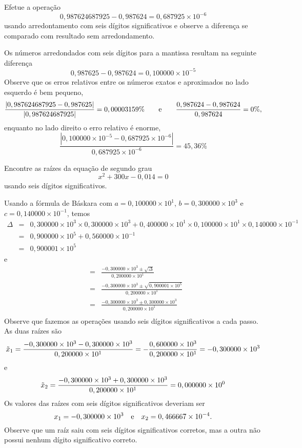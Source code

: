 \begin{ex}Efetue a operação
$$
0,987624687925-0,987624=0,687925\times 10^{-6}
$$
usando arredontamento com seis dígitos significativos e observe a diferença se comparado com resultado sem arredondamento.

Os números arredondados com seis dígitos para a mantissa resultam na seguinte diferença
$$
0,987625-0,987624=0,100000\times 10^{-5}
$$
Observe que os erros relativos entre os números exatos e aproximados no lado esquerdo é bem pequeno,
$$
\frac{|0,987624687925-0,987625|}{|0,987624687925|}=0,00003159\%\qquad\hbox{e}\qquad \frac{0,987624-0,987624}{0,987624}=0\%,
$$
enquanto no lado direito o erro relativo é enorme,
$$
\frac{|0,100000\times 10^{-5}-0,687925\times 10^{-6}|}{0,687925\times 10^{-6}}=45,36\%
$$

\end{ex}

\begin{ex} Encontre as raízes da equação de segundo grau
$$
x^2+300x-0,014=0
$$
usando seis dígitos significativos.

Usando a fórmula de Báskara com $a=0,100000\times 10^1$, $b=0,300000\times 10^3$ e $c=0,140000\times 10^{-1}$, temos
\begin{eqnarray*}
\Delta&=&0,300000\times 10^3\times 0,300000\times 10^3 +0,400000\times 10^1\times 0,100000\times 10^1\times 0,140000\times 10^{-1}\\
&=&0,900000\times 10^5 +0,560000\times  10^{-1}\\
&=&0,900001\times 10^5
\end{eqnarray*}
e
\begin{eqnarray*}
&=&\frac{-0,300000\times 10^3\pm \sqrt{\Delta}}{0,200000\times 10^1} \\
&=&\frac{-0,300000\times 10^3\pm \sqrt{0,900001\times 10^5}}{0,200000\times 10^1} \\
&=&\frac{-0,300000\times 10^3\pm 0,300000\times 10^3}{0,200000\times 10^1}\\
\end{eqnarray*}
Observe que fazemos as operações usando seis dígitos significativos a cada passo. As duas raízes são
$$
\tilde{x}_1=\frac{-0,300000\times 10^3- 0,300000\times 10^3}{0,200000\times 10^1}=-\frac{0,600000\times 10^3}{0,200000\times 10^1}=-0,300000\times 10^3\\
$$
e
$$
\tilde{x}_2=\frac{-0,300000\times 10^3+ 0,300000\times 10^3}{0,200000\times 10^1}=0,000000\times 10^{0}\\
$$
Os valores das raízes com seis dígitos significativos deveriam ser
$$
x_1=-0,300000\times 10^{3}\quad\hbox{e}\quad x_2=0,466667\times 10^{-4}.
$$
Observe que um raíz saiu com seis dígitos significativos corretos, mas a outra não possui nenhum dígito significativo correto.
\end{ex}

